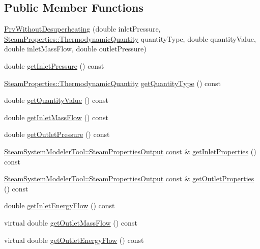 \subsection*{Public Member Functions}
\begin{DoxyCompactItemize}
\item 
\hyperlink{class_prv_without_desuperheating_a27a40131cc8567ec51bb8d6d522268c0}{Prv\+Without\+Desuperheating} (double inlet\+Pressure, \hyperlink{class_steam_properties_ae0294bedf7d178c2d8fb6aed0f62fbff}{Steam\+Properties\+::\+Thermodynamic\+Quantity} quantity\+Type, double quantity\+Value, double inlet\+Mass\+Flow, double outlet\+Pressure)
\item 
double \hyperlink{class_prv_without_desuperheating_a4b1244b479abfaef01abbb62395dff13}{get\+Inlet\+Pressure} () const
\item 
\hyperlink{class_steam_properties_ae0294bedf7d178c2d8fb6aed0f62fbff}{Steam\+Properties\+::\+Thermodynamic\+Quantity} \hyperlink{class_prv_without_desuperheating_ad465c855f0c7271110ed2cb2ebccf081}{get\+Quantity\+Type} () const
\item 
double \hyperlink{class_prv_without_desuperheating_a1113c254f45d08588b0afe4bd1273530}{get\+Quantity\+Value} () const
\item 
double \hyperlink{class_prv_without_desuperheating_a0ae2ed88cc8bd4e69cddc05ef1225811}{get\+Inlet\+Mass\+Flow} () const
\item 
double \hyperlink{class_prv_without_desuperheating_ae1d335703442deec2f2c2f93e4c862f2}{get\+Outlet\+Pressure} () const
\item 
\hyperlink{struct_steam_system_modeler_tool_1_1_steam_properties_output}{Steam\+System\+Modeler\+Tool\+::\+Steam\+Properties\+Output} const  \& \hyperlink{class_prv_without_desuperheating_aefb61f9d9dd99216459f6948308d11e9}{get\+Inlet\+Properties} () const
\item 
\hyperlink{struct_steam_system_modeler_tool_1_1_steam_properties_output}{Steam\+System\+Modeler\+Tool\+::\+Steam\+Properties\+Output} const  \& \hyperlink{class_prv_without_desuperheating_afcf1f5d7e6b18643ac8adc9023578147}{get\+Outlet\+Properties} () const
\item 
double \hyperlink{class_prv_without_desuperheating_a040dbe6a11a722f15450cd00ac454c48}{get\+Inlet\+Energy\+Flow} () const
\item 
virtual double \hyperlink{class_prv_without_desuperheating_aefe4227f2c01209ba4ce79f6b5825d73}{get\+Outlet\+Mass\+Flow} () const
\item 
virtual double \hyperlink{class_prv_without_desuperheating_a6529a68ffa444ae87c890b2bcbc2cc84}{get\+Outlet\+Energy\+Flow} () const

\end{DoxyCompactItemize}
